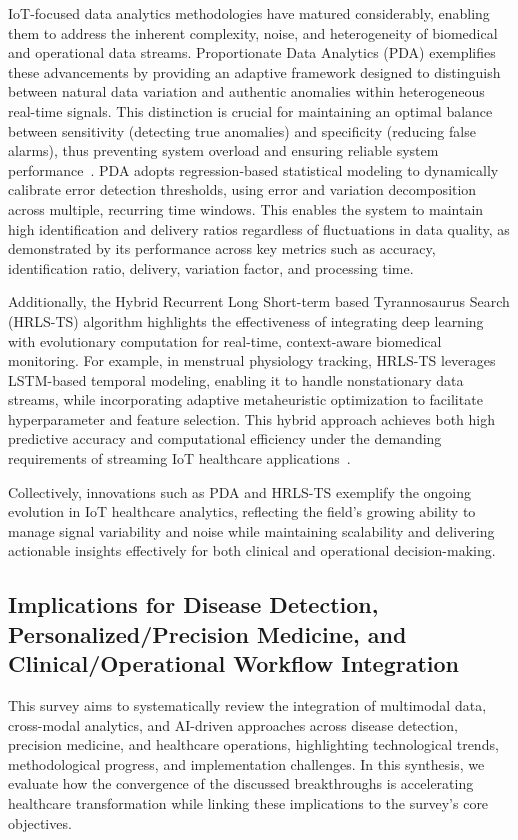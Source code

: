 \documentclass[sigconf]{acmart}
\begin{document}
IoT-focused data analytics methodologies have matured considerably, enabling them to address the inherent complexity, noise, and heterogeneity of biomedical and operational data streams. Proportionate Data Analytics (PDA) exemplifies these advancements by providing an adaptive framework designed to distinguish between natural data variation and authentic anomalies within heterogeneous real-time signals. This distinction is crucial for maintaining an optimal balance between sensitivity (detecting true anomalies) and specificity (reducing false alarms), thus preventing system overload and ensuring reliable system performance~\cite{ref106}. PDA adopts regression-based statistical modeling to dynamically calibrate error detection thresholds, using error and variation decomposition across multiple, recurring time windows. This enables the system to maintain high identification and delivery ratios regardless of fluctuations in data quality, as demonstrated by its performance across key metrics such as accuracy, identification ratio, delivery, variation factor, and processing time.

Additionally, the Hybrid Recurrent Long Short-term based Tyrannosaurus Search (HRLS-TS) algorithm highlights the effectiveness of integrating deep learning with evolutionary computation for real-time, context-aware biomedical monitoring. For example, in menstrual physiology tracking, HRLS-TS leverages LSTM-based temporal modeling, enabling it to handle nonstationary data streams, while incorporating adaptive metaheuristic optimization to facilitate hyperparameter and feature selection. This hybrid approach achieves both high predictive accuracy and computational efficiency under the demanding requirements of streaming IoT healthcare applications~\cite{ref107}. 

Collectively, innovations such as PDA and HRLS-TS exemplify the ongoing evolution in IoT healthcare analytics, reflecting the field's growing ability to manage signal variability and noise while maintaining scalability and delivering actionable insights effectively for both clinical and operational decision-making.

\subsection{Implications for Disease Detection, Personalized/Precision Medicine, and Clinical/Operational Workflow Integration}

This survey aims to systematically review the integration of multimodal data, cross-modal analytics, and AI-driven approaches across disease detection, precision medicine, and healthcare operations, highlighting technological trends, methodological progress, and implementation challenges. In this synthesis, we evaluate how the convergence of the discussed breakthroughs is accelerating healthcare transformation while linking these implications to the survey's core objectives.
\end{document}

